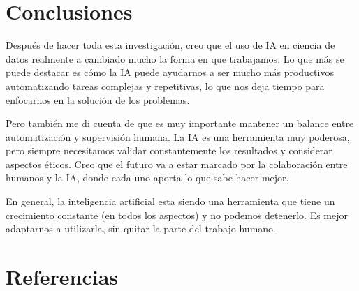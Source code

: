 \documentclass[11pt]{article}
\begin{document}
\section*{Conclusiones}

Despu\'es de hacer toda esta investigaci\'on, creo que el uso de IA en ciencia de datos realmente a cambiado mucho la forma en que trabajamos.
Lo que m\'as se puede destacar es c\'omo la IA puede ayudarnos a ser mucho m\'as productivos automatizando tareas complejas y repetitivas, lo que nos deja tiempo para enfocarnos en la soluci\'on de los problemas.

Pero tambi\'en me di cuenta de que es muy importante mantener un balance entre automatizaci\'on y supervisi\'on humana.
La IA es una herramienta muy poderosa, pero siempre necesitamos validar constantemente los resultados y considerar aspectos \'eticos.
Creo que el futuro va a estar marcado por la colaboraci\'on entre humanos y la IA, donde cada uno aporta lo que sabe hacer mejor.

En general, la inteligencia artificial esta siendo una herramienta que tiene un crecimiento constante (en todos los aspectos) y no podemos detenerlo.
Es mejor adaptarnos a utilizarla, sin quitar la parte del trabajo humano.

\section*{Referencias}
\end{document}
